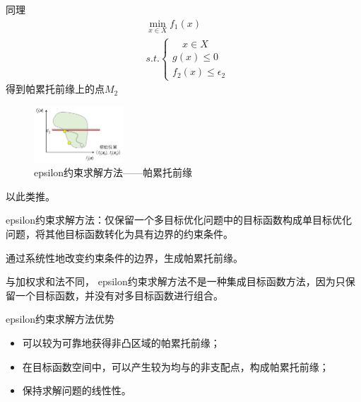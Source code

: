 \begin{example}
    同理
    \begin{equation}
        \begin{aligned}
             & \min_{x \in X} f_1(x)        \\
             & s.t.   \begin{cases}
                          \quad x \in X \\
                          g(x) \leq 0   \\
                          f_2(x) \leq \epsilon_2
                      \end{cases}
        \end{aligned}
    \end{equation}
    得到帕累托前缘上的点$M_2$
    \begin{figure}[ht]
        \centering
        \includegraphics[width=0.3\textwidth]{pic/2.7.10.png}
        \caption{epsilon约束求解方法——帕累托前缘}
    \end{figure}
    以此类推。
\end{example}

epsilon约束求解方法：仅保留一个多目标优化问题中的目标函数构成单目标优化问题，将其他目标函数转化为具有边界的约束条件。

通过系统性地改变约束条件的边界，生成帕累托前缘。

与加权求和法不同， epsilon约束求解方法不是一种集成目标函数方法，因为只保留一个目标函数，并没有对多目标函数进行组合。

epsilon约束求解方法优势
\begin{itemize}[itemsep=0pt,parsep=0pt]
    \item 可以较为可靠地获得非凸区域的帕累托前缘；
    \item  在目标函数空间中，可以产生较为均与的非支配点，构成帕累托前缘；
    \item 保持求解问题的线性性。
\end{itemize}